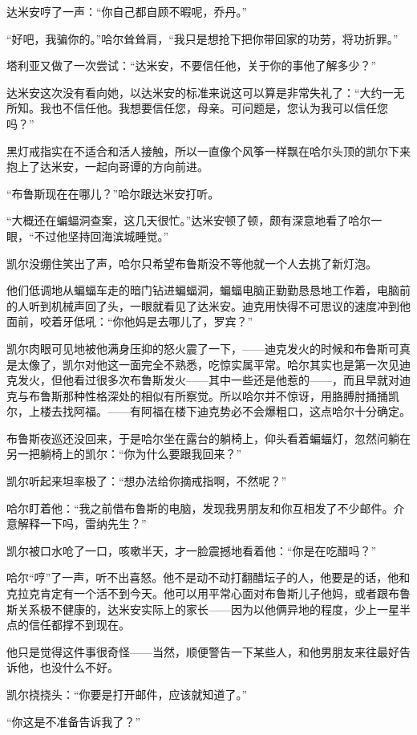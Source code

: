 \documentclass[../main]{subfiles}
\begin{document}
达米安哼了一声：“你自己都自顾不暇呢，乔丹。”

“好吧，我骗你的。”哈尔耸耸肩，“我只是想抢下把你带回家的功劳，将功折罪。”

塔利亚又做了一次尝试：“达米安，不要信任他，关于你的事他了解多少？”

达米安这次没有看向她，以达米安的标准来说这可以算是非常失礼了：“大约一无所知。我也不信任他。我想要信任您，母亲。可问题是，您认为我可以信任您吗？”

黑灯戒指实在不适合和活人接触，所以一直像个风筝一样飘在哈尔头顶的凯尔下来抱上了达米安，一起向哥谭的方向前进。

“布鲁斯现在在哪儿？”哈尔跟达米安打听。

“大概还在蝙蝠洞查案，这几天很忙。”达米安顿了顿，颇有深意地看了哈尔一眼，“不过他坚持回海滨城睡觉。”

凯尔没绷住笑出了声，哈尔只希望布鲁斯没不等他就一个人去挑了新灯泡。

他们低调地从蝙蝠车走的暗门钻进蝙蝠洞，蝙蝠电脑正勤勤恳恳地工作着，电脑前的人听到机械声回了头，一眼就看见了达米安。迪克用快得不可思议的速度冲到他面前，咬着牙低吼：“你他妈是去哪儿了，罗宾？”

凯尔肉眼可见地被他满身压抑的怒火震了一下，——迪克发火的时候和布鲁斯可真是太像了，凯尔对他这一面完全不熟悉，吃惊实属平常。哈尔其实也是第一次见迪克发火，但他看过很多次布鲁斯发火——其中一些还是他惹的——，而且早就对迪克与布鲁斯那种性格深处的相似有所察觉。所以哈尔并不惊讶，用胳膊肘捅捅凯尔，上楼去找阿福。——有阿福在楼下迪克势必不会爆粗口，这点哈尔十分确定。

布鲁斯夜巡还没回来，于是哈尔坐在露台的躺椅上，仰头看着蝙蝠灯，忽然问躺在另一把躺椅上的凯尔：“你为什么要跟我回来？”

凯尔听起来坦率极了：“想办法给你摘戒指啊，不然呢？”

哈尔盯着他：“我之前借布鲁斯的电脑，发现我男朋友和你互相发了不少邮件。介意解释一下吗，雷纳先生？”

凯尔被口水呛了一口，咳嗽半天，才一脸震撼地看着他：“你是在吃醋吗？”

哈尔“哼”了一声，听不出喜怒。他不是动不动打翻醋坛子的人，他要是的话，他和克拉克肯定有一个活不到今天。他可以用平常心面对布鲁斯儿子他妈，或者跟布鲁斯关系极不健康的，达米安实际上的家长——因为以他俩异地的程度，少上一星半点的信任都撑不到现在。

他只是觉得这件事很奇怪——当然，顺便警告一下某些人，和他男朋友来往最好告诉他，也没什么不好。

凯尔挠挠头：“你要是打开邮件，应该就知道了。”

“你这是不准备告诉我了？”
\end{document}
